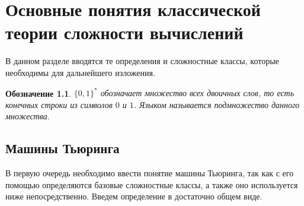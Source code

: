 \documentclass[14pt, a4paper]{extreport}
\newtheorem{notation}{\indent Обозначение}
\newcommand{\word}{\{0, 1\}^*}
\begin{document}
\chapter{Основные понятия классической теории сложности вычислений}
В данном разделе вводятся те определения и сложностные классы, которые необходимы для дальнейшего изложения.
\begin{notation}$\word$ обозначает множество всех двоичных слов, то есть конечных строки из символов $0$ и $1$. Языком называется подмножество данного множества.
\end{notation}
\section{Машины Тьюринга}
В первую очередь необходимо ввести понятие машины Тьюринга, так как с его помощью определяются базовые сложностные классы, а также оно используется ниже непосредственно. Введем определение в достаточно общем виде.
\end{document}

